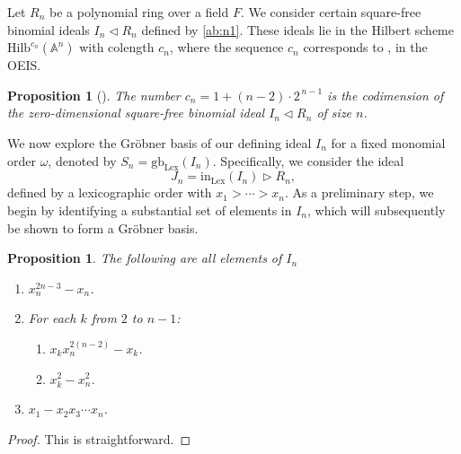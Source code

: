 \documentclass[11pt]{amsart}
\theoremstyle{plain}
\newtheorem{prop}[theorem]{Proposition}
\theoremstyle{definition}
\theoremstyle{remark}
\begin{document}
Let \(R_n \) be a polynomial ring over a field \( F \). We consider certain square-free binomial ideals \(I_n\lhd R_n\) defined by \eqref{ab:n1}. These ideals lie in the Hilbert scheme $\text{Hilb}^{c_n}(\mathbb{A}^n)$ with colength $c_n$, where the sequence \( c_n\) corresponds to \citep[A000337]{Sloane2010}, in the OEIS.

\begin{prop}[\cite{Udoetal2025}]\label{prop:colength}
	The number \(c_{n}=1+(n-2)\cdot 2^{\,n-1}\) is the codimension of the zero-dimensional square-free binomial ideal \(I_n \lhd R_n \) of size $n$.
\end{prop}

We now explore the Gr\"{o}bner basis of our defining ideal \(I_n\) for a fixed monomial order \( \omega \), denoted by \(  S_n=\text{gb}_{\text{Lex}}(I_n) \). Specifically, we consider the ideal \[J_n = \text{in}_{\text{Lex}} (I_n) \triangleright R_n, \] defined by a lexicographic order with \( x_1 > \cdots > x_n \). As a preliminary step, we begin by identifying a substantial set of elements in \(I_n\), which will subsequently be shown to form a Gr\"{o}bner basis. 

\begin{prop}
	The following are all elements of \(I_n\)
	\begin{enumerate}
		\item[(1)] \(x_n^{2n-3}-x_n\).
		\item[(2)] For each \(k\) from \(2\) to \(n-1\):
		\begin{enumerate}
			\item[(i)] \(x_kx_n^{2(n-2)}-x_k\).
			\item[(ii)] \(x_k^2-x_n^2\).
		\end{enumerate}
		\item[(3)] \(x_1-x_2x_3\cdots x_n\).
	\end{enumerate}
\end{prop}
\begin{proof}
	This is straightforward.
\end{proof}

\smallskip
\end{document}
